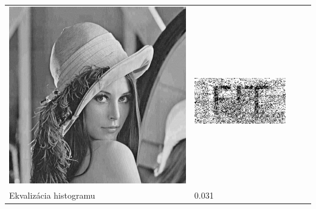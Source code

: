 \begin{table}[h]
\begin{tabular}{llcc}
\begin{minipage}[c]{.1\textwidth}
  \includegraphics[scale=0.1]{obrazky/sharpen}
\end{minipage} &
\begin{minipage}[c]{.15\textwidth}
\ 
  \includegraphics[scale=0.25]{obrazky/sharpen-wm}
\end{minipage} \\
Ekvalizácia histogramu                 & 0.031 &
\begin{minipage}[c]{.1\textwidth}
\ 

\end{minipage}
\end{tabular}
\end{table}
